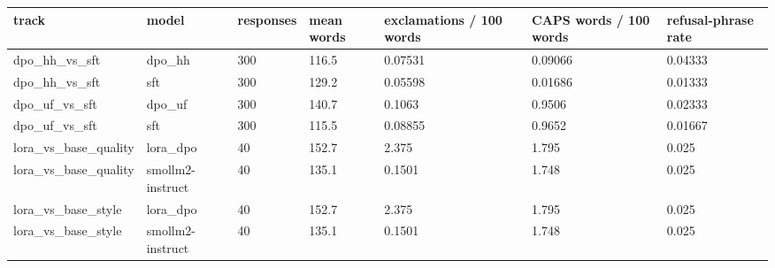 \begin{tabular}{lllllll}
\hline
track & model & responses & mean words & exclamations / 100 words & CAPS words / 100 words & refusal-phrase rate \\
\hline
dpo\_hh\_vs\_sft & dpo\_hh & 300 & 116.5 & 0.07531 & 0.09066 & 0.04333 \\
dpo\_hh\_vs\_sft & sft & 300 & 129.2 & 0.05598 & 0.01686 & 0.01333 \\
dpo\_uf\_vs\_sft & dpo\_uf & 300 & 140.7 & 0.1063 & 0.9506 & 0.02333 \\
dpo\_uf\_vs\_sft & sft & 300 & 115.5 & 0.08855 & 0.9652 & 0.01667 \\
lora\_vs\_base\_quality & lora\_dpo & 40 & 152.7 & 2.375 & 1.795 & 0.025 \\
lora\_vs\_base\_quality & smollm2-instruct & 40 & 135.1 & 0.1501 & 1.748 & 0.025 \\
lora\_vs\_base\_style & lora\_dpo & 40 & 152.7 & 2.375 & 1.795 & 0.025 \\
lora\_vs\_base\_style & smollm2-instruct & 40 & 135.1 & 0.1501 & 1.748 & 0.025 \\
\hline
\end{tabular}
